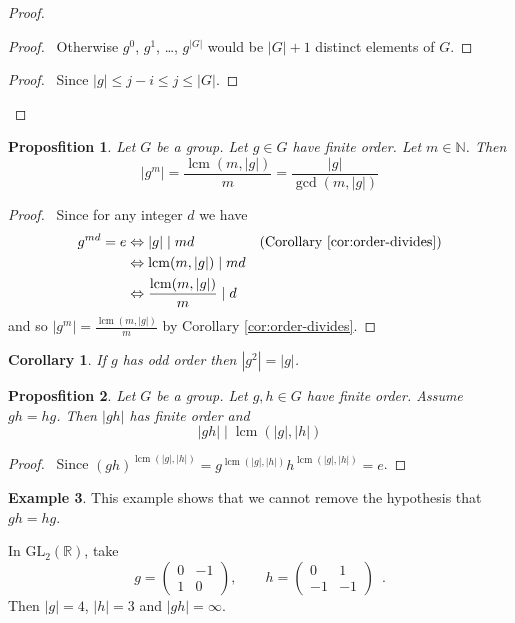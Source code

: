 \documentclass{book}
\let\qed\relax
\newtheorem{prop}{Proposfition}[chapter]
\newtheorem{cor}{Corollary}[prop]
\theoremstyle{definition}
\newtheorem{ex}[prop]{Example}
\newcommand{\lcm}{\ensuremath{\operatorname{lcm}}}
\begin{document}
\begin{proof}
    \pf
    \begin{proof}
        \pf\ Otherwise $g^0$, $g^1$, \ldots, $g^{|G|}$ would be $|G| + 1$ distinct elements of $G$.
    \end{proof}
    \begin{proof}
        \pf\ Since $|g| \leq j - i \leq j \leq |G|$.
    \end{proof}
    \qed
\end{proof}

\begin{prop}
\label{prop:order-of-g-to-the-m}
    Let $G$ be a group. Let $g \in G$ have finite order. Let $m \in \mathbb{N}$. Then
    \[ |g^m| = \frac{\lcm(m,|g|)}{m} = \frac{|g|}{\gcd(m,|g|)}\]
\end{prop}

\begin{proof}
    \pf\ Since for any integer $d$ we have
    \begin{align*}
        g^{md} = e & \Leftrightarrow |g| \mid md                  & (\text{Corollary \ref{cor:order-divides}}) \\
                   & \Leftrightarrow \lcm(m,|g|) \mid md                                                       \\
                   & \Leftrightarrow \frac{\lcm(m,|g|)}{m} \mid d & \qed
    \end{align*}
    and so $|g^m| = \frac{\lcm(m,|g|)}{m}$ by Corollary \ref{cor:order-divides}. \qed
\end{proof}

\begin{cor}
    If $g$ has odd order then $|g^2| = |g|$.
\end{cor}

\begin{prop}
    \label{prop:order-gh}
    Let $G$ be a group. Let $g,h \in G$ have finite order. Assume $gh = hg$. Then $|gh|$ has finite order and
    \[ |gh| \mid \lcm(|g|,|h|)\]
\end{prop}

\begin{proof}
    \pf\ Since $(gh)^{\lcm(|g|,|h|)} = g^{\lcm(|g|,|h|)}h^{\lcm(|g|,|h|)} = e$. \qed
\end{proof}

\begin{ex}
    This example shows that we cannot remove the hypothesis that $gh = hg$.

    In $\mathrm{GL}_2(\mathbb{R})$, take
    \[ g = \left( \begin{array}{cc} 0 & -1 \\ 1 & 0 \end{array} \right), \qquad
        h = \left( \begin{array}{cc} 0 & 1 \\ -1 & -1 \end{array} \right) \enspace . \]
    Then $|g| = 4$, $|h| = 3$ and $|gh| = \infty$.
\end{ex}
\end{document}

